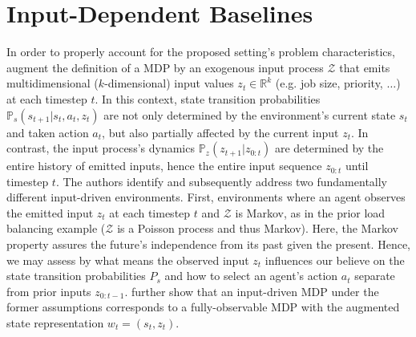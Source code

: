 
\section{Input-Dependent Baselines}

In order to properly account for the proposed setting's problem characteristics, \citeauthor{mao2018variance} augment the definition of a MDP by an exogenous input process $\mathcal{Z}$ that emits multidimensional ($k$-dimensional) input values $z_t \in \mathbb{R}^k$ (e.g. job size, priority, $\dots$) at each timestep $t$. In this context, state transition probabilities $\mathbb{P}_s(s_{t+1} | s_t, a_t, z_t)$ are not only determined by the environment's current state $s_t$ and taken action $a_t$, but also partially affected by the current input $z_t$. In contrast, the input process's dynamics $\mathbb{P}_z(z_{t+1}|z_{0:t})$ are determined by the entire history of emitted inputs, hence the entire input sequence $z_{0:t}$ until timestep $t$. 
The authors identify and subsequently address two fundamentally different input-driven environments. First, environments where an agent observes the emitted input $z_t$ at each timestep $t$ and $\mathcal{Z}$ is Markov, as in the prior load balancing example ($\mathcal{Z}$ is a Poisson process and thus Markov). Here, the Markov property assures the future's independence from its past given the present. Hence, we may assess by what means the observed input $z_t$ influences our believe on the state transition probabilities $P_s$ and how to select an agent's action $a_t$ separate from prior inputs $z_{0:t-1}$. \citeauthor{mao2018variance} further show that an input-driven MDP under the former assumptions corresponds to a fully-observable MDP with the augmented state representation $w_t = (s_t, z_t)$.

